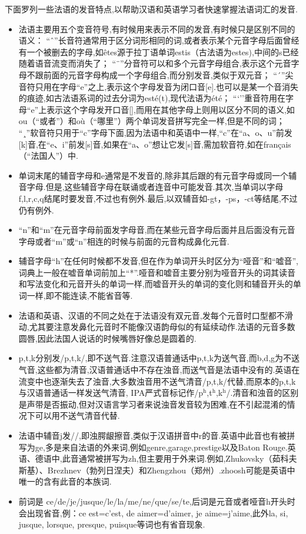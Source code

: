 下面罗列一些法语的发音特点,以帮助汉语和英语学习者快速掌握法语词汇的发音.

\begin{itemize}
	\item 法语主要用五个变音符号,有时候用来表示不同的发音,有时候只是区别不同的语义：
	\subitem ``ˆ''长音符通常用于区分词形相同的词,或者表示某个元音字母后面曾经有一个被删去的字母,如êtes源于拉丁语单词estis（古法语为estes),中间的s已经随着语音流变而消失了；
	\subitem ``¨''分音符可以和多个元音字母组合,表示这个元音字母不跟前面的元音字母构成一个字母组合,而分别发音,类似于双元音；
	\subitem ``´''尖音符只用在字母``e''之上,表示这个字母发音为闭口音[e].也可以是某一个音消失的痕迹,如古法语系词的过去分词为esté(t),现代法语为été；
	\subitem ```''重音符用在字母``e''上表示这个字母发开口音[\textepsilon],而用在其他字母上则用以区分不同的语义,如ou（``或者''）和où（``哪里''）两个单词发音拼写完全一样,但是不同的词；
	\subitem ``¸''软音符只用于``c''字母下面,因为法语中和英语中一样,``c''在``a、o、u''前发[k]音,在``e、i''前发[s]音,如果在``a、o''想让它发[s]音,需加软音符,如在français（``法国人''）中.
	\item 单词末尾的辅音字母和e通常是不发音的,除非其后跟的有元音字母或同一个辅音字母.但是,这些辅音字母在联诵或者连音中可能发音.其次,当单词以字母f,l,r,c,q结尾时要发音,不过也有例外.最后,以双辅音如-gt，-ps，-ct等结尾,不过仍有例外.
	\item ``n''和``m''在元音字母前面发字母音,而在某些元音字母后面并且后面没有元音字母或者``m''或``n''相连的时候与前面的元音构成鼻化元音.
	\item 辅音字母``h''在任何时候都不发音,但在作为单词开头时区分为``哑音''和``嘘音'',词典上一般在嘘音单词前加上``*''.哑音和嘘音主要分别为哑音开头的词其读音和写法变化和元音开头的单词一样,而嘘音开头的单词的变化则和辅音开头的单词一样,即不能连读,不能省音等.
	\item 法语和英语、汉语的不同之处在于法语没有双元音,发每个元音时口型都不滑动,尤其要注意发鼻化元音时不能像汉语韵母似的有延续动作.法语的元音多数圆唇,因此法国人说话的时候嘴唇好像总是圆着的.
	\item p,t,k分别发/p,t,k/,即不送气音.注意汉语普通话中p,t,k为送气音,而b,d,g为不送气音,这些都为清音,汉语普通话中不存在浊音,而送气音是法语中没有的.英语在流变中也逐渐失去了浊音,大多数浊音用不送气清音/p,t,k/代替,而原本的p,t,k与汉语普通话一样发送气清音, IPA严式音标记作/p$^\text{h}$,t$^\text{h}$,k$^\text{h}$/.清音和浊音的区别是声带是否振动,但对汉语言学习者来说浊音发音较为困难,在不引起混淆的情况下可以用不送气清音代替.
	\item 法语中辅音j发/\textyogh/,即浊腭龈擦音,类似于汉语拼音中r的音.英语中此音也有被拼写为ge,多是来自法语的外来词,例如genre,garage,prestige以及Baton Rouge.英语、德语中,此音通常被拼写为zh,但主要用于外来词.例如,Zhukovsky（茹科夫斯基）、Brezhnev（勃列日涅夫）和Zhengzhou（郑州）.zhoosh可能是英语中唯一的含有此音的本族词.
	\item 前词是 ce/de/je/jusque/le/la/me/ne/que/se/te,后词是元音或者哑音h开头时会出现省音,例：ce est=c'est, de aimer=d'aimer, je aime=j'aime,此外la, si, jusque, lorsque, presque, puisque等词也有省音现象.
\end{itemize}

